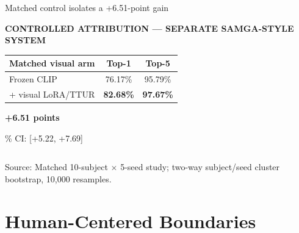 \documentclass[aspectratio=169]{beamer}
\newcommand{\sourcefooter}[1]{%
  \vfill
  {\color{MidGray}\fontsize{6.7}{8.0}\selectfont Source: #1\par}
}
\newcommand{\smalllabel}[2]{%
  {\color{#1}\bfseries\fontsize{9.5}{11.5}\selectfont\MakeUppercase{#2}\par}
}
\begin{document}
\begin{frame}{Matched control isolates a +6.51-point gain}
  \smalllabel{AccentOrange}{Controlled attribution --- separate SAMGA-style system}
  \vspace{3pt}

  \begin{center}
    \renewcommand{\arraystretch}{1.28}
    \begin{tabular}{>{\raggedright\arraybackslash}p{6.0cm}cc}
      \toprule
      \textbf{Matched visual arm} & \textbf{Top-1} & \textbf{Top-5}\\
      \midrule
      Frozen CLIP & 76.17\% & 95.79\%\\
      + visual LoRA/TTUR & \textbf{\color{VisionGreen}82.68\%}
                         & \textbf{\color{VisionGreen}97.67\%}\\
      \bottomrule
    \end{tabular}
  \end{center}

  \vspace{2pt}
  \begin{center}
    {\color{AccentOrange}\bfseries\fontsize{27}{31}\selectfont +6.51 points\par}
    {\color{MidGray}\fontsize{11.5}{14}\% CI: [+5.22, +7.69]
    \par}
  \end{center}

  \vspace{1pt}
  \begin{columns}[T,onlytextwidth]
  \end{columns}
  \sourcefooter{Matched 10-subject $\times$ 5-seed study; two-way subject/seed cluster bootstrap, 10,000 resamples.}
\end{frame}

\section{Human-Centered Boundaries}
\end{document}
